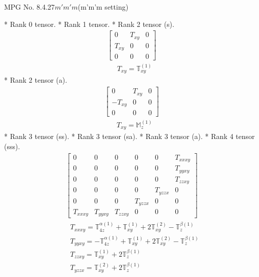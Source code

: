 \documentclass[fleqn,8pt,landscape]{jsarticle}
\begin{document}
\setcounter{MaxMatrixCols}{32}

\renewcommand{\tablename}{Table~}
\renewcommand{\figurename}{Figure~}
\begin{center}
\LARGE
MPG No. 8.4.27\quad$m'm'm$\quad(m'm'm setting)
\end{center}
* Rank 0 tensor.
* Rank 1 tensor.
* Rank 2 tensor (s).
\begin{align*}
\begin{bmatrix} 0 & T_{xy} & 0 \\ T_{xy} & 0 & 0 \\ 0 & 0 & 0 \end{bmatrix}
\end{align*}
\begin{align*}
& T_{xy} = \mathbb{T}_{xy}^{(1)}
\end{align*}
* Rank 2 tensor (a).
\begin{align*}
\begin{bmatrix} 0 & T_{xy} & 0 \\ - T_{xy} & 0 & 0 \\ 0 & 0 & 0 \end{bmatrix}
\end{align*}
\begin{align*}
& T_{xy} = \mathbb{M}_{z}^{(1)}
\end{align*}
* Rank 3 tensor (ss).
* Rank 3 tensor (sa).
* Rank 3 tensor (a).
* Rank 4 tensor (sss).
\begin{align*}
\begin{bmatrix} 0 & 0 & 0 & 0 & 0 & T_{xxxy} \\ 0 & 0 & 0 & 0 & 0 & T_{yyxy} \\ 0 & 0 & 0 & 0 & 0 & T_{zzxy} \\ 0 & 0 & 0 & 0 & T_{yzzx} & 0 \\ 0 & 0 & 0 & T_{yzzx} & 0 & 0 \\ T_{xxxy} & T_{yyxy} & T_{zzxy} & 0 & 0 & 0 \end{bmatrix}
\end{align*}
\begin{align*}
& T_{xxxy} = \mathbb{T}_{4z}^{\alpha(1)} + \mathbb{T}_{xy}^{(1)} + 2 \mathbb{T}_{xy}^{(2)} - \mathbb{T}_{z}^{\beta(1)} \\
& T_{yyxy} = - \mathbb{T}_{4z}^{\alpha(1)} + \mathbb{T}_{xy}^{(1)} + 2 \mathbb{T}_{xy}^{(2)} - \mathbb{T}_{z}^{\beta(1)} \\
& T_{zzxy} = \mathbb{T}_{xy}^{(1)} + 2 \mathbb{T}_{z}^{\beta(1)} \\
& T_{yzzx} = \mathbb{T}_{xy}^{(2)} + 2 \mathbb{T}_{z}^{\beta(1)}
\end{align*}
\end{document}
